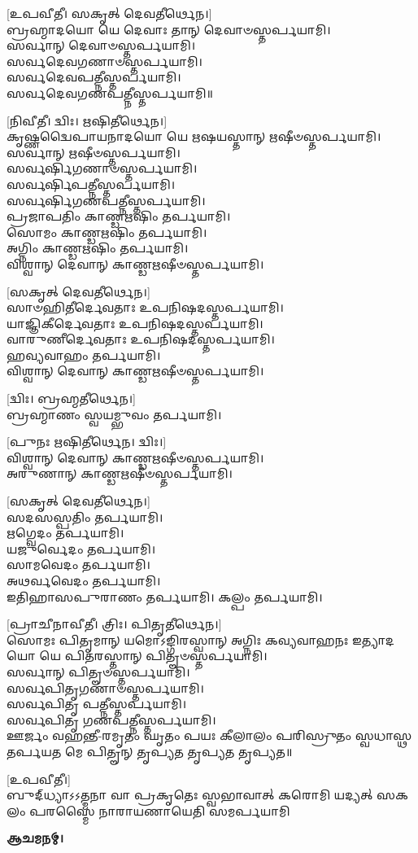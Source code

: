 \vspace{-1ex}
{\scriptsize [𑌉𑌪𑌵𑍀𑌤𑍀। 𑌸𑌕𑍃𑌤𑍍 𑌦𑍇𑌵𑌤𑍀𑌰𑍍𑌥𑍇𑌨।]}\\
𑌬𑍍𑌰𑌹𑍍𑌮𑌾𑌦𑌯𑍋 𑌯𑍇 𑌦𑍇𑌵𑌾𑌃 𑌤𑌾𑌨𑍍 𑌦𑍇𑌵𑌾𑍞𑌸𑍍𑌤𑌰𑍍𑌪𑌯𑌾𑌮𑌿।\\
𑌸𑌰𑍍𑌵𑌾𑌨𑍍 𑌦𑍇𑌵𑌾𑍞𑌸𑍍𑌤𑌰𑍍𑌪𑌯𑌾𑌮𑌿।\\
𑌸𑌰𑍍𑌵𑌦𑍇𑌵𑌗𑌣𑌾𑍞𑌸𑍍𑌤𑌰𑍍𑌪𑌯𑌾𑌮𑌿।\\
𑌸𑌰𑍍𑌵𑌦𑍇𑌵𑌪𑌤𑍍𑌨𑍀𑌸𑍍𑌤𑌰𑍍𑌪𑌯𑌾𑌮𑌿।\\
𑌸𑌰𑍍𑌵𑌦𑍇𑌵𑌗𑌣𑌪𑌤𑍍𑌨𑍀𑌸𑍍𑌤𑌰𑍍𑌪𑌯𑌾𑌮𑌿॥

{\scriptsize [𑌨𑌿𑌵𑍀𑌤𑍀। 𑌦𑍍𑌵𑌿𑌃। 𑌋𑌷𑌿𑌤𑍀𑌰𑍍𑌥𑍇𑌨।]}\\
𑌕𑍃𑌷𑍍𑌣𑌦𑍍𑌵𑍈𑌪𑌾𑌯𑌨𑌾𑌦𑌯𑍋 𑌯𑍇 𑌋𑌷𑌯𑌸𑍍𑌤𑌾𑌨𑍍 𑌋𑌷𑍀𑍞𑌸𑍍𑌤𑌰𑍍𑌪𑌯𑌾𑌮𑌿।\\
𑌸𑌰𑍍𑌵𑌾𑌨𑍍 𑌋𑌷𑍀𑍞𑌸𑍍𑌤𑌰𑍍𑌪𑌯𑌾𑌮𑌿।\\
𑌸𑌰𑍍𑌵𑌰𑍍𑌷𑌿𑌗𑌣𑌾𑍞𑌸𑍍𑌤𑌰𑍍𑌪𑌯𑌾𑌮𑌿।\\
𑌸𑌰𑍍𑌵𑌰𑍍𑌷𑌿𑌪𑌤𑍍𑌨𑍀𑌸𑍍𑌤𑌰𑍍𑌪𑌯𑌾𑌮𑌿।\\
𑌸𑌰𑍍𑌵𑌰𑍍𑌷𑌿𑌗𑌣𑌪𑌤𑍍𑌨𑍀𑌸𑍍𑌤𑌰𑍍𑌪𑌯𑌾𑌮𑌿।\\
𑌪𑍍𑌰𑌜𑌾𑌪𑌤𑌿𑌂 𑌕𑌾𑌣𑍍𑌡𑌋𑌷𑌿𑌂 𑌤𑌰𑍍𑌪𑌯𑌾𑌮𑌿।\\
𑌸𑍋𑌮𑌂 𑌕𑌾𑌣𑍍𑌡𑌋𑌷𑌿𑌂 𑌤𑌰𑍍𑌪𑌯𑌾𑌮𑌿।\\
𑌅𑌗𑍍𑌨𑌿𑌂 𑌕𑌾𑌣𑍍𑌡𑌋𑌷𑌿𑌂 𑌤𑌰𑍍𑌪𑌯𑌾𑌮𑌿।\\
𑌵𑌿𑌶𑍍𑌵𑌾𑌨𑍍 𑌦𑍇𑌵𑌾𑌨𑍍 𑌕𑌾𑌣𑍍𑌡𑌋𑌷𑍀𑍞𑌸𑍍𑌤𑌰𑍍𑌪𑌯𑌾𑌮𑌿।
\pagebreak[4]

{\scriptsize [𑌸𑌕𑍃𑌤𑍍 𑌦𑍇𑌵𑌤𑍀𑌰𑍍𑌥𑍇𑌨।]}\\
𑌸𑌾𑍞𑌹𑌿𑌤𑍀𑌰𑍍𑌦𑍇𑌵𑌤𑌾𑌃 𑌉𑌪𑌨𑌿𑌷𑌦𑌸𑍍𑌤𑌰𑍍𑌪𑌯𑌾𑌮𑌿।\\
𑌯𑌾𑌜𑍍𑌞𑌿𑌕𑍀𑌰𑍍𑌦𑍇𑌵𑌤𑌾𑌃 𑌉𑌪𑌨𑌿𑌷𑌦𑌸𑍍𑌤𑌰𑍍𑌪𑌯𑌾𑌮𑌿।\\
𑌵𑌾𑌰𑍁𑌣𑍀𑌰𑍍𑌦𑍇𑌵𑌤𑌾𑌃 𑌉𑌪𑌨𑌿𑌷𑌦𑌸𑍍𑌤𑌰𑍍𑌪𑌯𑌾𑌮𑌿।\\
𑌹𑌵𑍍𑌯𑌵𑌾𑌹𑌂 𑌤𑌰𑍍𑌪𑌯𑌾𑌮𑌿।\\
𑌵𑌿𑌶𑍍𑌵𑌾𑌨𑍍 𑌦𑍇𑌵𑌾𑌨𑍍 𑌕𑌾𑌣𑍍𑌡𑌋𑌷𑍀𑍞𑌸𑍍𑌤𑌰𑍍𑌪𑌯𑌾𑌮𑌿।

{\scriptsize [𑌦𑍍𑌵𑌿𑌃। 𑌬𑍍𑌰𑌹𑍍𑌮𑌤𑍀𑌰𑍍𑌥𑍇𑌨।]}\\
𑌬𑍍𑌰𑌹𑍍𑌮𑌾𑌣𑌂 𑌸𑍍𑌵𑌯𑌮𑍍𑌭𑍁𑌵𑌂 𑌤𑌰𑍍𑌪𑌯𑌾𑌮𑌿।

{\scriptsize [𑌪𑍁𑌨𑌃 𑌋𑌷𑌿𑌤𑍀𑌰𑍍𑌥𑍇𑌨। 𑌦𑍍𑌵𑌿𑌃।]}\\
𑌵𑌿𑌶𑍍𑌵𑌾𑌨𑍍 𑌦𑍇𑌵𑌾𑌨𑍍 𑌕𑌾𑌣𑍍𑌡𑌋𑌷𑍀𑍞𑌸𑍍𑌤𑌰𑍍𑌪𑌯𑌾𑌮𑌿।\\
𑌅𑌰𑍁𑌣𑌾𑌨𑍍 𑌕𑌾𑌣𑍍𑌡𑌋𑌷𑍀𑍞𑌸𑍍𑌤𑌰𑍍𑌪𑌯𑌾𑌮𑌿।

{\scriptsize [𑌸𑌕𑍃𑌤𑍍 𑌦𑍇𑌵𑌤𑍀𑌰𑍍𑌥𑍇𑌨।]}\\
𑌸𑌦𑌸𑌸𑍍𑌪𑌤𑌿𑌂 𑌤𑌰𑍍𑌪𑌯𑌾𑌮𑌿।\\
𑌋𑌗𑍍𑌵𑍇𑌦𑌂 𑌤𑌰𑍍𑌪𑌯𑌾𑌮𑌿।\\
𑌯𑌜𑍁𑌰𑍍𑌵𑍇𑌦𑌂 𑌤𑌰𑍍𑌪𑌯𑌾𑌮𑌿।\\
𑌸𑌾𑌮𑌵𑍇𑌦𑌂 𑌤𑌰𑍍𑌪𑌯𑌾𑌮𑌿।\\
𑌅𑌥𑌰𑍍𑌵𑌵𑍇𑌦𑌂 𑌤𑌰𑍍𑌪𑌯𑌾𑌮𑌿।\\
𑌇𑌤𑌿𑌹𑌾𑌸𑌪𑍁𑌰𑌾𑌣𑌂 𑌤𑌰𑍍𑌪𑌯𑌾𑌮𑌿। 𑌕𑌲𑍍𑌪𑌂 𑌤𑌰𑍍𑌪𑌯𑌾𑌮𑌿।

{\scriptsize [𑌪𑍍𑌰𑌾𑌚𑍀𑌨𑌾𑌵𑍀𑌤𑍀। 𑌤𑍍𑌰𑌿𑌃। 𑌪𑌿𑌤𑍃𑌤𑍀𑌰𑍍𑌥𑍇𑌨।]}\\
𑌸𑍋𑌮𑌃 𑌪𑌿𑌤𑍃𑌮𑌾𑌨𑍍 𑌯𑌮𑍋𑌽𑌙𑍍𑌗𑌿𑌰𑌸𑍍𑌵𑌾𑌨𑍍 𑌅𑌗𑍍𑌨𑌿𑌃 𑌕𑌵𑍍𑌯𑌵𑌾𑌹𑌨𑌃 𑌇𑌤𑍍𑌯𑌾𑌦𑌯𑍋 𑌯𑍇 𑌪𑌿𑌤𑌰𑌸𑍍𑌤𑌾𑌨𑍍 𑌪𑌿𑌤𑍄𑍞𑌸𑍍𑌤𑌰𑍍𑌪𑌯𑌾𑌮𑌿।\\
𑌸𑌰𑍍𑌵𑌾𑌨𑍍 𑌪𑌿𑌤𑍄𑍞𑌸𑍍𑌤𑌰𑍍𑌪𑌯𑌾𑌮𑌿।\\
𑌸𑌰𑍍𑌵𑌪𑌿𑌤𑍃𑌗𑌣𑌾𑍞𑌸𑍍𑌤𑌰𑍍𑌪𑌯𑌾𑌮𑌿।\\
𑌸𑌰𑍍𑌵𑌪𑌿𑌤𑍃 𑌪𑌤𑍍𑌨𑍀𑌸𑍍𑌤𑌰𑍍𑌪𑌯𑌾𑌮𑌿।\\
𑌸𑌰𑍍𑌵𑌪𑌿𑌤𑍃 𑌗𑌣𑌪𑌤𑍍𑌨𑍀𑌸𑍍𑌤𑌰𑍍𑌪𑌯𑌾𑌮𑌿।\\
𑌊𑌰𑍍𑌜𑌂 𑌵𑌹𑌨𑍍𑌤𑍀-𑌰𑌮𑍃𑌤𑌂 𑌘𑍃𑌤𑌂 𑌪𑌯𑌃 𑌕𑍀𑌲𑌾𑌲𑌂 𑌪𑌰𑌿𑌸𑍍𑌰𑍁𑌤𑌂 𑌸𑍍𑌵𑌧𑌾𑌸𑍍𑌥 𑌤𑌰𑍍𑌪𑌯𑌤 𑌮𑍇 𑌪𑌿𑌤𑍄𑌨𑍍 𑌤𑍃𑌪𑍍𑌯𑌤 𑌤𑍃𑌪𑍍𑌯𑌤 𑌤𑍃𑌪𑍍𑌯𑌤॥

{\scriptsize [𑌉𑌪𑌵𑍀𑌤𑍀।]}\\
\vspace{-3ex}
{𑌬𑍁𑌦𑍍‌𑌧𑍍𑌯𑌾𑌽𑌽𑌤𑍍𑌮𑌨𑌾 𑌵𑌾 𑌪𑍍𑌰𑌕𑍃𑌤𑍇𑌃 𑌸𑍍𑌵𑌭𑌾𑌵𑌾𑌤𑍍}
{𑌕𑌰𑍋𑌮𑌿 𑌯𑌦𑍍𑌯𑌤𑍍 𑌸𑌕𑌲𑌂 𑌪𑌰𑌸𑍍𑌮𑍈}
{𑌨𑌾𑌰𑌾𑌯𑌣𑌾𑌯𑍇𑌤𑌿 𑌸𑌮𑌰𑍍𑌪𑌯𑌾𑌮𑌿}

\textbf{𑌆𑌚𑌮𑌨𑌮𑍍।}

